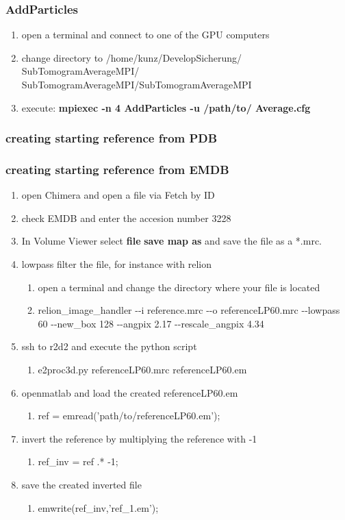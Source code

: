 \documentclass[12pt,a4paper]{scrartcl}
\begin{document}
{\subsubsection{AddParticles} 
\begin{enumerate}
	\item open a terminal and connect to one of the GPU computers
	\item change directory to /home/kunz/DevelopSicherung/							SubTomogramAverageMPI/ SubTomogramAverageMPI/SubTomogramAverageMPI 
	\item execute: \textbf{mpiexec -n 4 AddParticles -u /path/to/					Average.cfg}
\end{enumerate}
\label{AddParticles}
\subsubsection{creating starting reference from PDB}
\subsubsection{creating starting reference from EMDB}
\begin{enumerate}
	\item open Chimera and open a file via Fetch by ID
	\item check EMDB and enter the accesion number 3228
	\item In Volume Viewer select \textbf{file}  \textbf{save map as} and save the file as a *.mrc. 
	\item lowpass filter the file, for instance with relion
	\begin{enumerate}
		\item open a terminal and change the directory where your file is located
		\item relion\_image\_handler \--\--i reference.mrc \--\--o referenceLP60.mrc \--\--lowpass 60 \--\--new\_box 128 \--\--angpix 2.17 \--\--rescale\_angpix 4.34
	\end{enumerate}
	\item ssh to r2d2 and execute the python script 
	\begin{enumerate}
	\item e2proc3d.py referenceLP60.mrc referenceLP60.em
	\end{enumerate}
\item openmatlab and load the created referenceLP60.em
		\begin{enumerate}
			\item ref = emread('path/to/referenceLP60.em');
		\end{enumerate}
\item invert the reference by multiplying the reference with -1 
	\begin{enumerate}
		\item ref\_inv = ref .* -1; 
	\end{enumerate}
\item save the created inverted file 
	\begin{enumerate}
		\item emwrite(ref\_inv,'ref\_1.em'); 
	\end{enumerate}
\end{enumerate}

}
\end{document}

